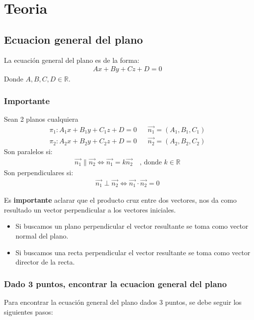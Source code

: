\documentclass{templateNote}
\begin{document}
\portada
\margenes %


\section{Teoria}
\subsection{Ecuacion general del plano}
\indent
La ecuación general del plano es de la forma:
\begin{align*}
    Ax + By + Cz + D = 0
\end{align*}
Donde $A, B, C, D \in \mathbb{R}$.

\subsubsection{Importante}
Sean 2 planos cualquiera
\begin{align*}
    \pi_1: A_1x + B_1y + C_1z + D = 0 && \overrightarrow{n_1} = (A_1, B_1, C_1)\\
    \pi_2: A_2x + B_2y + C_2z + D = 0 && \overrightarrow{n_2} = (A_2, B_2, C_2)
\end{align*}
Son paralelos si:
\begin{align*}
    \overrightarrow{n_1} \parallel \overrightarrow{n_2} \iff \overrightarrow{n_1} = k\overrightarrow{n_2} \quad \text{, donde } k \in \mathbb{R}
\end{align*}
Son perpendiculares si:
\begin{align*}
    \overrightarrow{n_1} \perp \overrightarrow{n_2} \iff \overrightarrow{n_1} \cdot \overrightarrow{n_2} = 0
\end{align*}

Es \textbf{importante} aclarar que el producto cruz entre dos vectores, nos da como resultado un vector perpendicular a los vectores iniciales.
\begin{itemize}
    \item Si buscamos un plano perpendicular el vector resultante se toma como vector normal del plano.
    \item Si buscamos una recta perpendicular el vector resultante se toma como vector director de la recta.
\end{itemize}

\newpage
\subsubsection{Dado 3 puntos, encontrar la ecuacion general del plano}
\indent
Para encontrar la ecuación general del plano dados 3 puntos, se debe seguir los siguientes pasos:
\end{document}
